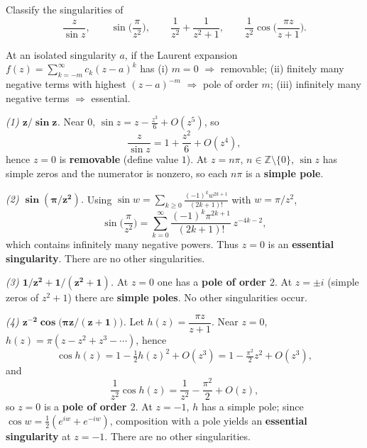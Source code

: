 \begin{problem}[CP-IV-0025]
\label{prob:cp-iv-0025}
Classify the singularities of
\[
\frac{z}{\sin z},\qquad
\sin\!\Big(\frac{\pi}{z^{2}}\Big),\qquad
\frac{1}{z^{2}}+\frac{1}{z^{2}+1},\qquad
\frac{1}{z^{2}}\cos\!\Big(\frac{\pi z}{z+1}\Big).
\]

At an isolated singularity $a$, if the Laurent expansion
$f(z)=\sum_{k=-m}^{\infty} c_k (z-a)^k$ has
(i) $m=0$ $\Rightarrow$ removable;
(ii) finitely many negative terms with highest $(z-a)^{-m}$ $\Rightarrow$ pole of order $m$;
(iii) infinitely many negative terms $\Rightarrow$ essential.

\medskip
\emph{(1) $\boldsymbol{z/\sin z}$.}
Near $0$, $\sin z=z-\frac{z^{3}}{6}+O(z^{5})$, so
\[
\frac{z}{\sin z}=1+\frac{z^{2}}{6}+O(z^{4}),
\]
hence $z=0$ is \textbf{removable} (define value $1$). At $z=n\pi$, $n\in\mathbb Z\setminus\{0\}$,
$\sin z$ has simple zeros and the numerator is nonzero, so each $n\pi$ is a \textbf{simple pole}.

\medskip
\emph{(2) $\boldsymbol{\sin(\pi/z^{2})}$.}
Using $\sin w=\sum_{k\ge0}\frac{(-1)^k w^{2k+1}}{(2k+1)!}$ with $w=\pi/z^{2}$,
\[
\sin\!\Big(\frac{\pi}{z^{2}}\Big)=\sum_{k=0}^{\infty}\frac{(-1)^k \pi^{2k+1}}{(2k+1)!}\,z^{-4k-2},
\]
which contains infinitely many negative powers. Thus $z=0$ is an \textbf{essential singularity}.
There are no other singularities.

\medskip
\emph{(3) $\boldsymbol{1/z^{2} + 1/(z^{2}+1)}$.}
At $z=0$ one has a \textbf{pole of order $2$}. At $z=\pm i$ (simple zeros of $z^{2}+1$) there are
\textbf{simple poles}. No other singularities occur.

\medskip
\emph{(4) $\boldsymbol{z^{-2}\cos\!\big(\pi z/(z+1)\big)}$.}
Let $h(z)=\dfrac{\pi z}{z+1}$.
Near $z=0$, $h(z)=\pi(z-z^{2}+z^{3}-\cdots)$, hence
\[
\cos h(z)=1-\tfrac12 h(z)^{2}+O(z^{3})=1-\tfrac{\pi^{2}}{2}z^{2}+O(z^{3}),
\]
and
\[
\frac{1}{z^{2}}\cos h(z)=\frac{1}{z^{2}}-\frac{\pi^{2}}{2}+O(z),
\]
so $z=0$ is a \textbf{pole of order $2$}. At $z=-1$, $h$ has a simple pole; since
$\cos w=\tfrac12(e^{iw}+e^{-iw})$, composition with a pole yields an \textbf{essential singularity}
at $z=-1$. There are no other singularities.

\end{problem}

